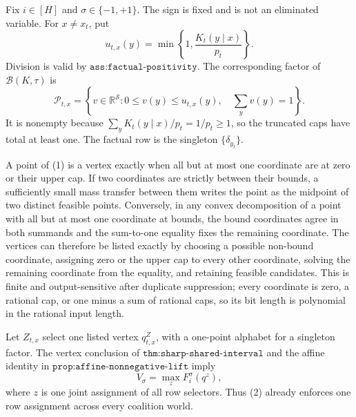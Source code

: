 Fix \(i\in[H]\) and \(\sigma\in\{-1,+1\}\).  The sign is fixed and is not an eliminated variable.  For \(x\ne x_t\), put
\[
 u_{t,x}(y)=\min\left\{1,\frac{K_t(y\mid x)}{p_t}\right\}.
\]
Division is valid by \(\texttt{ass:factual-positivity}\).  The corresponding factor of \(\mathcal B(K,\tau)\) is
\[
 \mathcal P_{t,x}=\left\{v\in\mathbb R^{\mathcal S}:
 0\le v(y)\le u_{t,x}(y),\quad \sum_yv(y)=1\right\}. \tag{1}
\]
It is nonempty because \(\sum_yK_t(y\mid x)/p_t=1/p_t\ge1\), so the truncated caps have total at least one.  The factual row is the singleton \(\{\delta_{y_t}\}\).

A point of (1) is a vertex exactly when all but at most one coordinate are at zero or their upper cap.  If two coordinates are strictly between their bounds, a sufficiently small mass transfer between them writes the point as the midpoint of two distinct feasible points.  Conversely, in any convex decomposition of a point with all but at most one coordinate at bounds, the bound coordinates agree in both summands and the sum-to-one equality fixes the remaining coordinate.  The vertices can therefore be listed exactly by choosing a possible non-bound coordinate, assigning zero or the upper cap to every other coordinate, solving the remaining coordinate from the equality, and retaining feasible candidates.  This is finite and output-sensitive after duplicate suppression; every coordinate is zero, a rational cap, or one minus a sum of rational caps, so its bit length is polynomial in the rational input length.

Let \(Z_{t,x}\) select one listed vertex \(q^Z_{t,x}\), with a one-point alphabet for a singleton factor.  The vertex conclusion of \(\texttt{thm:sharp-shared-interval}\) and the affine identity in \(\texttt{prop:affine-nonnegative-lift}\) imply
\[
 V_\sigma=\max_zF_i^\sigma(q^z), \tag{2}
\]
where \(z\) is one joint assignment of all row selectors.  Thus (2) already enforces one row assignment across every coalition world.

